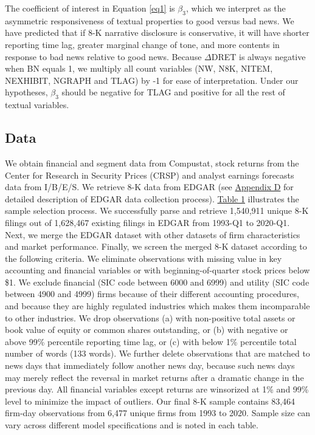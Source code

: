 \documentclass[letterpaper,12pt]{article}
\begin{document}
\begin{spacing}{1.5}
The coefficient of interest in Equation \eqref{eq1} is $\beta_3$, which we interpret as the asymmetric responsiveness of textual properties to good versus bad news. We have predicted that if 8-K narrative disclosure is conservative, it will have shorter reporting time lag, greater marginal change of tone, and more contents in response to bad news relative to good news. Because $\Delta$DRET is always negative when BN equals 1, we multiply all count variables (NW, N8K, NITEM, NEXHIBIT, NGRAPH and TLAG) by -1 for ease of interpretation. Under our hypotheses, $\beta_3$ should be negative for TLAG and positive for all the rest of textual variables.

\subsection{Data} \label{sec3.5}
\noindent We obtain financial and segment data from Compustat, stock returns from the Center for Research in Security Prices (CRSP) and analyst earnings forecasts data from I/B/E/S. We retrieve 8-K data from EDGAR (see \hyperref[appd]{Appendix D} for detailed description of EDGAR data collection process). \hyperref[T1]{Table 1} illustrates the sample selection process. We successfully parse and retrieve 1,540,911 unique 8-K filings out of 1,628,467 existing filings in EDGAR from 1993-Q1 to 2020-Q1. Next, we merge the EDGAR dataset with other datasets of firm characteristics and market performance. Finally, we screen the merged 8-K dataset according to the following criteria. We eliminate observations with missing value in key accounting and financial variables or with beginning-of-quarter stock prices below \$1. We exclude financial (SIC code between 6000 and 6999) and utility (SIC code between 4900 and 4999) firms because of their different accounting procedures, and because they are highly regulated industries which makes them incomparable to other industries. We drop observations (a) with non-positive total assets or book value of equity or common shares outstanding, or (b) with negative or above 99\% percentile reporting time lag, or (c) with below 1\% percentile total number of words (133 words). We further delete observations that are matched to news days that immediately follow another news day, because such news days may merely reflect the reversal in market returns after a dramatic change in the previous day. All financial variables except returns are winsorized at 1\% and 99\% level to minimize the impact of outliers. Our final 8-K sample contains 83,464 firm-day observations from 6,477 unique firms from 1993 to 2020. Sample size can vary across different model specifications and is noted in each table. 


\end{spacing}
\end{document}
